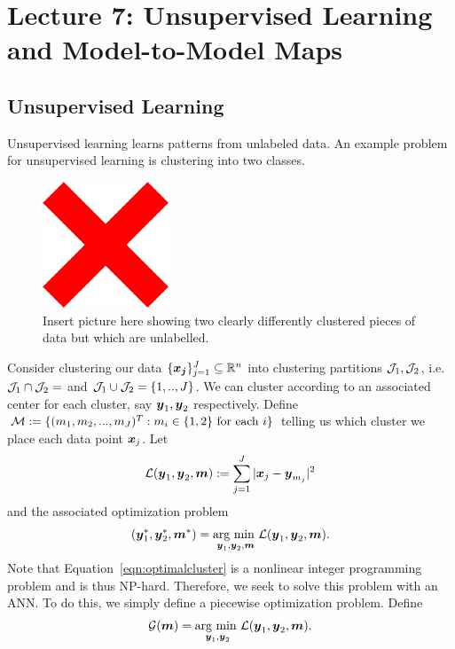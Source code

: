 \chapter{Lecture 7: Unsupervised Learning and Model-to-Model Maps}
\section{Unsupervised Learning}
Unsupervised learning learns patterns from unlabeled data. An example problem for unsupervised learning is clustering into two classes. 
\begin{figure}
    \centering
    \includegraphics{images/x.pdf}
    \caption{Insert picture here showing two clearly differently clustered pieces of data but which are unlabelled.}
    \label{fig:cluster}
\end{figure}
Consider clustering our data $\{\boldsymbol{x_{j}}\}_{j=1}^{J} \subseteq \mathbb{R}^{n}$ into clustering partitions $\mathcal{J}_1, \mathcal{J}_2$, i.e. $\mc{J}_{1} \cap \mc{J}_{2} = \empty$ and $\mathcal{J}_{1} \cup \mathcal{J}_{2} = \{1,..,J\}$. We can cluster according to an associated center for each cluster, say $\boldsymbol{y}_{1}, \boldsymbol{y}_{2}$ respectively. Define $\mathcal{M} := \{(m_1,m_2,...,m_J)^{T}:m_i \in \{1,2\} \textup{ for each } i\}$ telling us which cluster we place each data point $\boldsymbol{x}_{j}$. Let
\begin{align} \label{eqn:clusterloss}
    \mathcal{L}(\boldsymbol{y}_1, \boldsymbol{y}_2, \boldsymbol{m}) := \sum_{j=1}^{J} |\boldsymbol{x}_{j} - \boldsymbol{y}_{m_j}|^2
\end{align}
and the associated optimization problem
\begin{align} \label{eqn:optimalcluster}
    (\boldsymbol{y}_1^{*}, \boldsymbol{y}_{2}^{*}, \boldsymbol{m}^{*}) = \underset{\boldsymbol{y}_{1}, \boldsymbol{y}_{2}, \boldsymbol{m}}{\textup{arg min }} \mathcal{L}(\boldsymbol{y}_1, \boldsymbol{y}_{2}, \boldsymbol{m}).
\end{align}
Note that Equation~\ref{eqn:optimalcluster} is a nonlinear integer programming problem and is thus NP-hard. Therefore, we seek to solve this problem with an ANN. To do this, we simply define a piecewise optimization problem. Define
\begin{align}
    \mathcal{G}(\boldsymbol{m}) = \underset{\boldsymbol{y}_1, \boldsymbol{y}_2}{\textup{arg min }} \mathcal{L}(\boldsymbol{y}_1, \boldsymbol{y}_2, \boldsymbol{m}).
\end{align}

